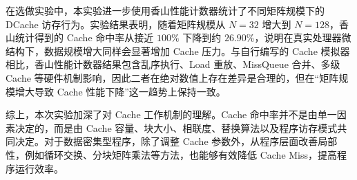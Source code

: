 在选做实验中，本实验进一步使用香山性能计数器统计了不同矩阵规模下的 DCache 访存行为。实验结果表明，随着矩阵规模从 $N=32$ 增大到 $N=128$，香山统计得到的 Cache 命中率从接近 $100\%$ 下降到约 $26.90\%$，说明在真实处理器微结构下，数据规模增大同样会显著增加 Cache 压力。与自行编写的 Cache 模拟器相比，香山性能计数器结果包含乱序执行、Load 重放、MissQueue 合并、多级 Cache 等硬件机制影响，因此二者在绝对数值上存在差异是合理的，但在“矩阵规模增大导致 Cache 性能下降”这一趋势上保持一致。

综上，本次实验加深了对 Cache 工作机制的理解。Cache 命中率并不是由单一因素决定的，而是由 Cache 容量、块大小、相联度、替换算法以及程序访存模式共同决定。对于数据密集型程序，除了调整 Cache 参数外，从程序层面改善局部性，例如循环交换、分块矩阵乘法等方法，也能够有效降低 Cache Miss，提高程序运行效率。
\newpage
